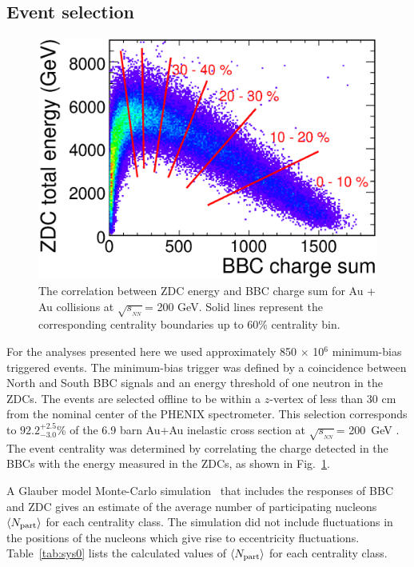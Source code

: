 \documentclass[aps,prc,superscriptaddress,showpacs,floatfix,twocolumn]{revtex4}
\newcommand \sqsn{\mbox{$\sqrt{s_{_{NN}}}$}\xspace}
\newcommand \anpart{\mbox{$\langle N_{\rm part} \rangle$}}
\newcommand \Au{{Au+Au}\xspace}
\begin{document}
\subsection{Event selection}
\begin{figure}[htbp]
\includegraphics[width=1.0\linewidth]{zdcenergy_bbcchargesum_correlation.eps}
\caption{ \label{bbc-zdc}
The correlation between ZDC energy and BBC charge sum for Au + Au collisions at \sqsn = 200 GeV. 
Solid lines represent the corresponding centrality boundaries up to 60\% centrality bin.
}
\end{figure}
For the analyses presented here we used approximately 850 
$\times$ 10$^6$ minimum-bias triggered events. The minimum-bias 
trigger was defined by a coincidence between North and South BBC 
signals and an energy threshold of one neutron in the ZDCs. The 
events are selected offline to be within a $z$-vertex of less 
than 30 cm from the nominal center of the PHENIX spectrometer. 
This selection corresponds to $92.2^{+2.5}_{-3.0}$\% of the 6.9 
barn \Au inelastic cross section at \sqsn = 200~GeV 
\cite{Miller:2007ri}. The event centrality was determined by 
correlating the charge detected in the BBCs with the energy 
measured in the ZDCs, as shown in Fig.~\ref{bbc-zdc}.

A Glauber model Monte-Carlo 
simulation~\cite{Glauber:1970jm,Adcox:2000sp,Adler:2003au} that 
includes the responses of BBC and ZDC gives an estimate of the 
average number of participating nucleons $\anpart$ for each 
centrality class. The simulation did not include fluctuations in 
the positions of the nucleons which give rise to eccentricity 
fluctuations. Table~\ref{tab:sys0} lists the calculated values 
of $\anpart$ for each centrality class.
\end{document}
